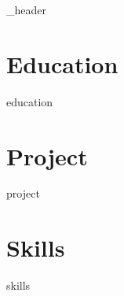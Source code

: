 \documentclass[letter,10pt]{article}
\author{Ethan Alker}
\begin{document}
{_header}
\vspace*{10pt}

\section{Education}
{education}
\vspace*{10pt}


\section{Project}
\vspace*{3pt}
{project}
\vspace*{10pt}

\section{Skills}
\vspace*{3pt}
{skills}
\vspace*{10pt}
\end{document}
